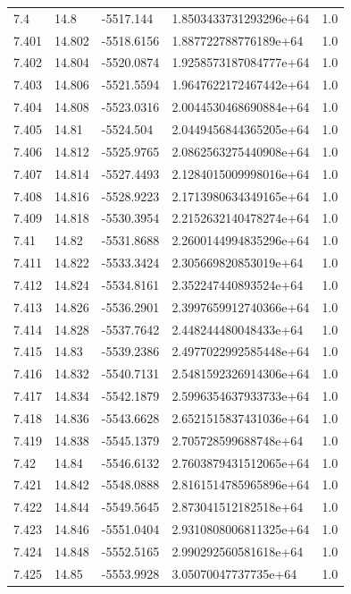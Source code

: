 \begin{tabular}{lllll}
7.4 & 14.8 & -5517.144 & 1.8503433731293296e+64 & 1.0 \\
7.401 & 14.802 & -5518.6156 & 1.887722788776189e+64 & 1.0 \\
7.402 & 14.804 & -5520.0874 & 1.9258573187084777e+64 & 1.0 \\
7.403 & 14.806 & -5521.5594 & 1.9647622172467442e+64 & 1.0 \\
7.404 & 14.808 & -5523.0316 & 2.0044530468690884e+64 & 1.0 \\
7.405 & 14.81 & -5524.504 & 2.0449456844365205e+64 & 1.0 \\
7.406 & 14.812 & -5525.9765 & 2.0862563275440908e+64 & 1.0 \\
7.407 & 14.814 & -5527.4493 & 2.1284015009998016e+64 & 1.0 \\
7.408 & 14.816 & -5528.9223 & 2.1713980634349165e+64 & 1.0 \\
7.409 & 14.818 & -5530.3954 & 2.2152632140478274e+64 & 1.0 \\
7.41 & 14.82 & -5531.8688 & 2.2600144994835296e+64 & 1.0 \\
7.411 & 14.822 & -5533.3424 & 2.305669820853019e+64 & 1.0 \\
7.412 & 14.824 & -5534.8161 & 2.352247440893524e+64 & 1.0 \\
7.413 & 14.826 & -5536.2901 & 2.3997659912740366e+64 & 1.0 \\
7.414 & 14.828 & -5537.7642 & 2.448244480048433e+64 & 1.0 \\
7.415 & 14.83 & -5539.2386 & 2.4977022992585448e+64 & 1.0 \\
7.416 & 14.832 & -5540.7131 & 2.5481592326914306e+64 & 1.0 \\
7.417 & 14.834 & -5542.1879 & 2.5996354637933733e+64 & 1.0 \\
7.418 & 14.836 & -5543.6628 & 2.6521515837431036e+64 & 1.0 \\
7.419 & 14.838 & -5545.1379 & 2.705728599688748e+64 & 1.0 \\
7.42 & 14.84 & -5546.6132 & 2.7603879431512065e+64 & 1.0 \\
7.421 & 14.842 & -5548.0888 & 2.8161514785965896e+64 & 1.0 \\
7.422 & 14.844 & -5549.5645 & 2.873041512182518e+64 & 1.0 \\
7.423 & 14.846 & -5551.0404 & 2.9310808006811325e+64 & 1.0 \\
7.424 & 14.848 & -5552.5165 & 2.990292560581618e+64 & 1.0 \\
7.425 & 14.85 & -5553.9928 & 3.05070047737735e+64 & 1.0 \\

\end{tabular}
